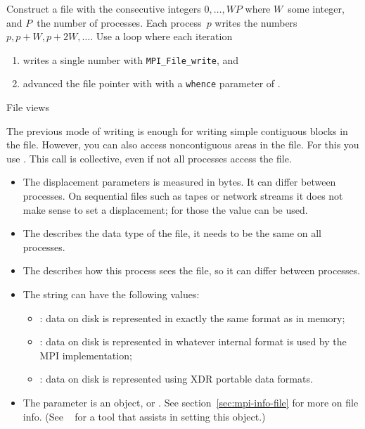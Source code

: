 \begin{exercise}
  \label{ex:blockseek}
  Construct a file with the consecutive integers $0,\ldots,WP$ where
  $W$~some integer, and $P$~the number of processes. Each process~$p$
  writes the numbers $p,p+W,p+2W,\ldots$. Use a loop where each iteration
  \begin{enumerate}
  \item writes a single number with \lstinline{MPI_File_write}, and
  \item advanced the file pointer with 
    with a \lstinline{whence} parameter of
    .
  \end{enumerate}
\end{exercise}

 {File views}

The previous mode of writing is enough for writing simple contiguous blocks in the file.
However,
you can also access noncontiguous areas in the file. For this you use
%
.
%
This call is collective, even if not all processes access the file.
\begin{itemize}
\item The  displacement parameters is measured in bytes. It
  can differ between processes. On sequential files such as tapes or
  network streams it does not make sense to set a displacement; for
  those the  value can be
  used.
\item The  describes the data type of the file, it needs to
  be the same on all processes.
\item The  describes how this process sees the file, so it
  can differ between processes.
\item The  string can have the following values:
  \begin{itemize}
  \item {}: data on disk is represented in exactly the same
    format as in memory;
  \item {}: data on disk is represented in whatever internal
    format is used by the MPI implementation;
  \item {}: data on disk is represented using XDR portable
    data formats.
  \end{itemize}
\item The  parameter is an  object,
  or .
  See section~\ref{sec:mpi-info-file} for more on file info.
  (See ~\cite{t3pio-git} for a tool that 
  assists in setting this object.)
\end{itemize}

